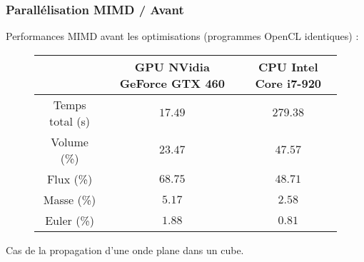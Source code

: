 \begin{frame}
\frametitle{Parallélisation MIMD / Avant}
\vfill
Performances MIMD avant les optimisations (programmes OpenCL identiques) :
\begin{figure}
	\centering		
		\begin{tabular}{|c|c|c|}
			\hline
			 & GPU NVidia GeForce GTX 460 & CPU Intel Core i7-920 \\ \hline\hline
			Temps total (s) & $17.49$ & $279.38$ \\	\hline
			Volume (\%) & $23.47$ & $47.57$ \\	\hline
			Flux (\%) & $68.75$ & $48.71$ \\	\hline
			Masse (\%) & $5.17$ & $2.58$ \\	\hline
			Euler (\%) & $1.88$ & $0.81$ \\	\hline
		\end{tabular}
\end{figure}
\vfill
Cas de la propagation d'une onde plane dans un cube.
\vfill
\end{frame}

